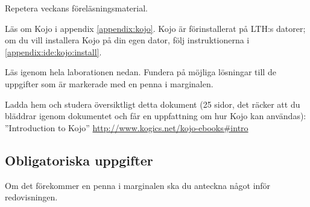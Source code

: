 
\Lab{\LabWeekONE}
%
\begin{Goals}

\end{Goals}

\begin{Preparations}
\item Repetera veckans föreläsningsmaterial.
\item {}%
\item Läs om Kojo i appendix \ref{appendix:kojo}. Kojo är förinstallerat på LTH:s datorer; om du vill installera Kojo på din egen dator, följ instruktionerna i \ref{appendix:ide:kojo:install}.
\item Läs igenom hela laborationen nedan. Fundera på möjliga lösningar till de uppgifter som är markerade med en penna i marginalen.
\item Ladda hem och studera översiktligt detta dokument (25 sidor, det räcker att du bläddrar igenom dokumentet och får en uppfattning om hur Kojo kan användas): \\ ''Introduction to Kojo'' \url{http://www.kogics.net/kojo-ebooks#intro}
\end{Preparations}

\subsection{Obligatoriska uppgifter}

Om det förekommer en penna i marginalen ska du anteckna något inför redovisningen.



